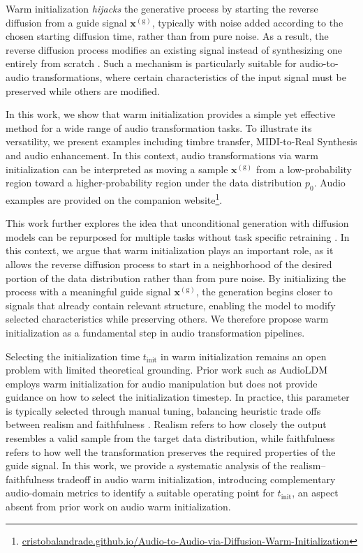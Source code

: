 \documentclass[twoside,a4paper]{article}
\begin{document}
Warm initialization \textit{hijacks} the generative process by starting the reverse diffusion from a guide signal $\mathbf{x}^{(\mathrm g)}$, typically with noise added according to the chosen starting diffusion time, rather than from pure noise. As a result, the reverse diffusion process modifies an existing signal instead of synthesizing one entirely from scratch \cite{meng2022sdeditguidedimagesynthesis, kawar2023imagic, lee2026diffusiontimbretransfermutual}.
Such a mechanism is particularly suitable for audio-to-audio transformations, where certain characteristics of the input signal must be preserved while others are modified.

In this work, we show that warm initialization provides a simple yet effective method for a wide range of audio transformation tasks. To illustrate its versatility, we present examples including timbre transfer, MIDI-to-Real Synthesis and audio enhancement.  In this context, audio transformations via warm initialization can be interpreted as moving a sample $\mathbf{x}^{(\mathrm g)}$ from a low-probability region toward a higher-probability region under the data distribution $p_0$. Audio examples are provided on the companion website\footnote{\href{https://cristobalandrade.github.io/Audio-to-Audio-via-Diffusion-Warm-Initialization/}{cristobalandrade.github.io/Audio-to-Audio-via-Diffusion-Warm-Initialization}\label{fn:AudioExamples}}.

This work further explores the idea that unconditional generation with diffusion models can be repurposed for multiple tasks without task specific retraining \cite{moliner2023solvingaudioinverseproblems}.   In this context, we argue that warm initialization plays an important role, as it allows the reverse diffusion process to start in a neighborhood of the desired portion of the data distribution rather than from pure noise. By initializing the process with a meaningful guide signal $\mathbf{x}^{(\mathrm g)}$, the generation begins closer to signals that already contain relevant structure, enabling the model to modify selected characteristics while preserving others. We therefore propose warm initialization as a fundamental step in audio transformation pipelines.


Selecting the initialization time $t_\text{init}$ in warm initialization remains an open problem with limited theoretical grounding. Prior work such as AudioLDM \cite{liu2023audioldm} employs warm initialization for audio manipulation but does not provide guidance on how to select the initialization timestep.  In practice, this parameter is typically selected through manual tuning, balancing heuristic trade offs between realism and faithfulness \cite{meng2022sdeditguidedimagesynthesis}. Realism refers to how closely the output resembles a valid sample from the target data distribution, while faithfulness refers to how well the transformation preserves the required properties of the guide signal. In this work, we provide a systematic analysis of the realism–faithfulness tradeoff in audio warm initialization, introducing complementary audio-domain metrics to identify a suitable operating point for $t_\text{init}$, an aspect absent from prior work on audio warm initialization.
\end{document}
